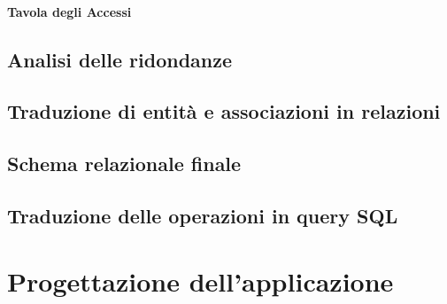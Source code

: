 \documentclass[a4paper,12pt]{report}
\begin{document}
	\subsubsection{Tavola degli Accessi}
	\section{Analisi delle ridondanze}
	\section{Traduzione di entità e associazioni in relazioni}
	\section{Schema relazionale finale}
	\section{Traduzione delle operazioni in query SQL}
	\chapter{Progettazione dell'applicazione}
\end{document}

